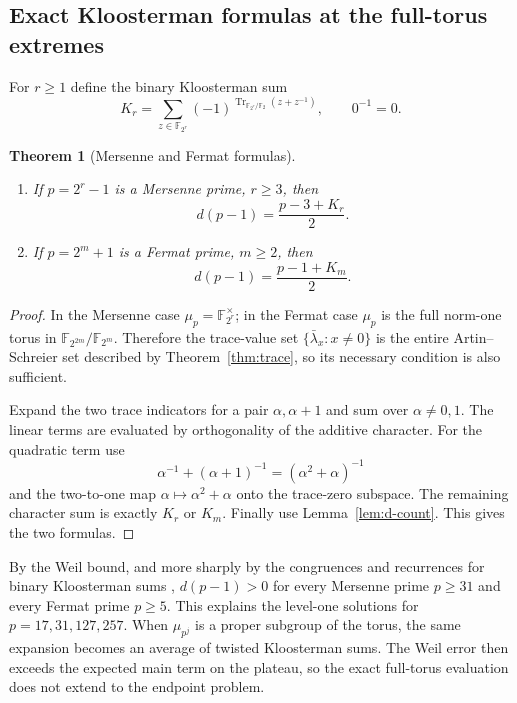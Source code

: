 \documentclass[a4paper]{article}
\newtheorem{theorem}{Theorem}[section]
\newcommand{\F}{\mathbb{F}}
\DeclareMathOperator{\Tr}{Tr}
\begin{document}
\subsection{Exact Kloosterman formulas at the full-torus extremes}
\label{sec:kloosterman}

For $r\geq1$ define the binary Kloosterman sum
\[
	K_r=\sum_{z\in\F_{2^r}}
	(-1)^{\Tr_{\F_{2^r}/\F_2}(z+z^{-1})},
	\qquad 0^{-1}=0.
\]

\begin{theorem}[Mersenne and Fermat formulas]\label{thm:kloosterman}
	\begin{enumerate}
		\item If $p=2^r-1$ is a Mersenne prime, $r\geq3$, then
		      \[
			      d(p-1)=\frac{p-3+K_r}{2}.
		      \]
		\item If $p=2^m+1$ is a Fermat prime, $m\geq2$, then
		      \[
			      d(p-1)=\frac{p-1+K_m}{2}.
		      \]
	\end{enumerate}
\end{theorem}

\begin{proof}
	In the Mersenne case $\mu_p=\F_{2^r}^{\times}$; in the Fermat case
	$\mu_p$ is the full norm-one torus in
	$\F_{2^{2m}}/\F_{2^m}$.  Therefore the trace-value set
	$\{\bar\lambda_x:x\neq0\}$ is the entire Artin--Schreier set described
	by Theorem~\ref{thm:trace}, so its necessary condition is also
	sufficient.

	Expand the two trace indicators for a pair
	$\alpha,\alpha+1$ and sum over $\alpha\neq0,1$.  The linear terms are
	evaluated by orthogonality of the additive character.  For the
	quadratic term use
	\[
		\alpha^{-1}+(\alpha+1)^{-1}
		=(\alpha^2+\alpha)^{-1}
	\]
	and the two-to-one map
	$\alpha\mapsto\alpha^2+\alpha$ onto the trace-zero subspace.
	The remaining character sum is exactly $K_r$ or $K_m$.
	Finally use Lemma~\ref{lem:d-count}.  This gives the two formulas.
\end{proof}

By the Weil bound, and more sharply by the congruences and recurrences for
binary Kloosterman sums \cite{LachaudWolfmann1990,Carlitz1969},
$d(p-1)>0$ for every Mersenne prime $p\geq31$ and every Fermat prime
$p\geq5$.  This explains the level-one solutions for
$p=17,31,127,257$.  When $\mu_{p^j}$ is a proper subgroup of the torus,
the same expansion becomes an average of twisted Kloosterman sums.  The
Weil error then exceeds the expected main term on the plateau, so the
exact full-torus evaluation does not extend to the endpoint problem.
\end{document}
